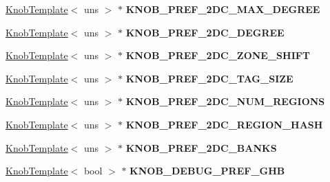 \begin{DoxyCompactItemize}
\item 
\hypertarget{classall__knobs__c_a1eff4e9c25651be7558b1d2e4621ddf5}{
\hyperlink{classKnobTemplate}{KnobTemplate}$<$ uns $>$ $\ast$ {\bfseries KNOB\_\-PREF\_\-2DC\_\-MAX\_\-DEGREE}}
\label{classall__knobs__c_a1eff4e9c25651be7558b1d2e4621ddf5}

\item 
\hypertarget{classall__knobs__c_a998accbaccdb6b29ccb6e18d96deb9c0}{
\hyperlink{classKnobTemplate}{KnobTemplate}$<$ uns $>$ $\ast$ {\bfseries KNOB\_\-PREF\_\-2DC\_\-DEGREE}}
\label{classall__knobs__c_a998accbaccdb6b29ccb6e18d96deb9c0}

\item 
\hypertarget{classall__knobs__c_a0405878abf89978de48e7873aedb3045}{
\hyperlink{classKnobTemplate}{KnobTemplate}$<$ uns $>$ $\ast$ {\bfseries KNOB\_\-PREF\_\-2DC\_\-ZONE\_\-SHIFT}}
\label{classall__knobs__c_a0405878abf89978de48e7873aedb3045}

\item 
\hypertarget{classall__knobs__c_a7ae2f14daba485ceef916d07799b28e2}{
\hyperlink{classKnobTemplate}{KnobTemplate}$<$ uns $>$ $\ast$ {\bfseries KNOB\_\-PREF\_\-2DC\_\-TAG\_\-SIZE}}
\label{classall__knobs__c_a7ae2f14daba485ceef916d07799b28e2}

\item 
\hypertarget{classall__knobs__c_a94ada7985cc6f5eaa9220489df5b1301}{
\hyperlink{classKnobTemplate}{KnobTemplate}$<$ uns $>$ $\ast$ {\bfseries KNOB\_\-PREF\_\-2DC\_\-NUM\_\-REGIONS}}
\label{classall__knobs__c_a94ada7985cc6f5eaa9220489df5b1301}

\item 
\hypertarget{classall__knobs__c_af33684ddccaad6fa5fe84fbae3c31f2a}{
\hyperlink{classKnobTemplate}{KnobTemplate}$<$ uns $>$ $\ast$ {\bfseries KNOB\_\-PREF\_\-2DC\_\-REGION\_\-HASH}}
\label{classall__knobs__c_af33684ddccaad6fa5fe84fbae3c31f2a}

\item 
\hypertarget{classall__knobs__c_a6523f1eb9956b41dde8a6a90abb6675c}{
\hyperlink{classKnobTemplate}{KnobTemplate}$<$ uns $>$ $\ast$ {\bfseries KNOB\_\-PREF\_\-2DC\_\-BANKS}}
\label{classall__knobs__c_a6523f1eb9956b41dde8a6a90abb6675c}

\item 
\hypertarget{classall__knobs__c_aa604a91e5bd686c9f89f434bc14a22b2}{
\hyperlink{classKnobTemplate}{KnobTemplate}$<$ bool $>$ $\ast$ {\bfseries KNOB\_\-DEBUG\_\-PREF\_\-GHB}}
\label{classall__knobs__c_aa604a91e5bd686c9f89f434bc14a22b2}


\end{DoxyCompactItemize}
